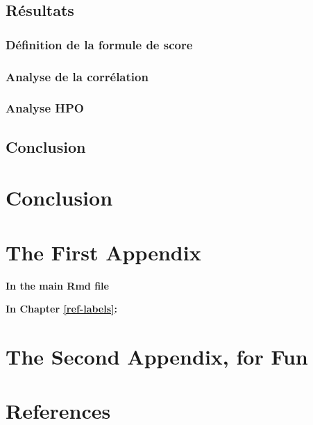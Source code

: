 \documentclass[12pt,twoside]{reedthesis}
\theoremstyle{definition}
\theoremstyle{definition}
\theoremstyle{remark}
\begin{document}
  \section{Résultats}\label{resultats}
  
  \subsection{Définition de la formule de
  score}\label{definition-de-la-formule-de-score}
  
  \subsection{Analyse de la corrélation}\label{analyse-de-la-correlation}
  
  \subsection{Analyse HPO}\label{analyse-hpo}
  
  \section{Conclusion}\label{conclusion}
  
  \chapter*{Conclusion}\label{conclusion-1}
  
  \appendix
  
  \chapter{The First Appendix}\label{the-first-appendix}
  
  \textbf{In the main Rmd file}
  
  \textbf{In Chapter \ref{ref-labels}:}
  
  \chapter{The Second Appendix, for
  Fun}\label{the-second-appendix-for-fun}
  
  \backmatter
  
  \chapter*{References}\label{references}
  
\end{document}
